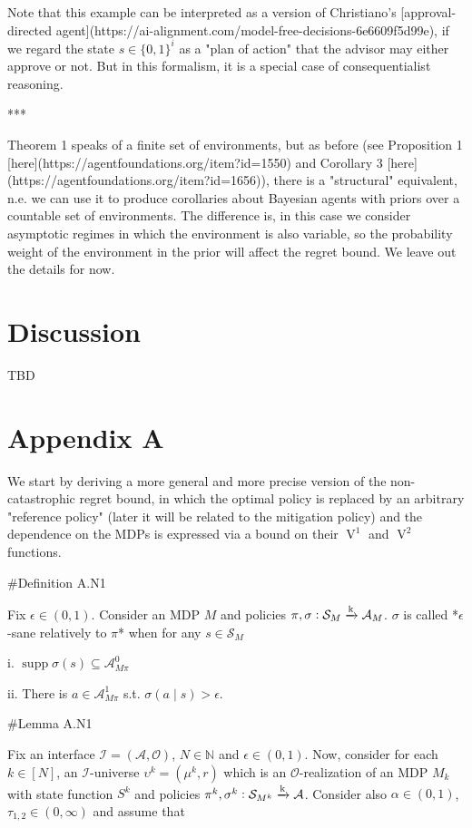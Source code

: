 \documentclass[a4paper]{article}
\newcommand{\Bool}{\{0,1\}}
\DeclareMathOperator{\Supp}{supp}
\newcommand{\Nats}{\mathbb{N}}
\newcommand{\M}{\xrightarrow{\textnormal{k}}}
\newcommand{\Ob}{\mathcal{O}}
\newcommand{\A}{\mathcal{A}}
\newcommand{\St}{\mathcal{S}}
\newcommand{\In}{\mathcal{I}}
\newcommand{\V}{\operatorname{V}}
\begin{document}
Note that this example can be interpreted as a version of Christiano's [approval-directed agent](https://ai-alignment.com/model-free-decisions-6e6609f5d99e), if we regard the state $s \in \Bool^{i}$ as a "plan of action" that the advisor may either approve or not. But in this formalism, it is a special case of consequentialist reasoning.

***

Theorem 1 speaks of a finite set of environments, but as before (see Proposition 1 [here](https://agentfoundations.org/item?id=1550) and Corollary 3 [here](https://agentfoundations.org/item?id=1656)), there is a "structural" equivalent, n.e. we can use it to produce corollaries about Bayesian agents with priors over a countable set of environments. The difference is, in this case we consider asymptotic regimes in which the environment is also variable, so the probability weight of the environment in the prior will affect the regret bound. We leave out the details for now.

\section{Discussion}

TBD

\section{Appendix A}

We start by deriving a more general and more precise version of the non-catastrophic regret bound, in which the optimal policy is replaced by an arbitrary "reference policy" (later it will be related to the mitigation policy) and the dependence on the MDPs is expressed via a bound on their $\V^1$ and $\V^2$ functions.

\#Definition A.N1

Fix $\epsilon\in(0,1)$. Consider an MDP $M$ and policies $\pi,\sigma: \St_M \M \A_M$. $\sigma$ is called *$\epsilon$-sane relatively to $\pi$* when for any $s \in \St_M$

i. $\Supp{\sigma(s)} \subseteq \A_{M\pi}^0$

ii. There is $a \in \A_{M\pi}^1$ s.t. $\sigma(a \mid s) > \epsilon$.

\#Lemma A.N1

Fix an interface $\In=(\A,\Ob)$, $N \in \Nats$ and $\epsilon \in (0,1)$. Now, consider for each $k \in [N]$, an $\In$-universe $\upsilon^k=(\mu^k,r)$ which is an $\Ob$-realization of an MDP $M_k$ with state function $S^k$ and policies $\pi^k,\sigma^k: \St_{M^k} \M \A$. Consider also $\alpha\in(0,1)$, $\tau_{1,2} \in (0,\infty)$ and assume that 
\end{document}
